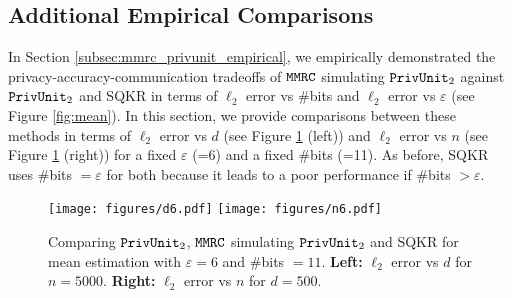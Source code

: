 \subsection{Additional Empirical Comparisons}\label{appendix:mmrc_pu_emp}
In Section \ref{subsec:mmrc_privunit_empirical}, we empirically demonstrated the privacy-accuracy-communication tradeoffs of $\texttt{MMRC}$ simulating $\texttt{PrivUnit}_2$ against $\texttt{PrivUnit}_2$ and SQKR in terms of $\ell_2$ error vs $\#$bits and $\ell_2$ error vs $\varepsilon$ (see Figure \ref{fig:mean}). In this section, we provide comparisons between these methods in terms of $\ell_2$ error vs $d$ (see Figure \ref{fig:mean_app} (left)) and $\ell_2$ error vs $n$ (see Figure \ref{fig:mean_app} (right)) for a fixed $\varepsilon$ (=6) and a fixed $\#$bits (=11). As before, SQKR uses $\#$bits $= \varepsilon$ for both because it leads to a poor performance if $\#$bits $ > \varepsilon$.
\begin{figure}[h]
\centering
\texttt{[image: figures/d6.pdf]} \qquad \texttt{[image: figures/n6.pdf]}%
\caption{Comparing $\texttt{PrivUnit}_2$, $\texttt{MMRC}$ simulating $\texttt{PrivUnit}_2$ and SQKR for mean estimation with $\varepsilon=6$ and $\#$bits $=11$. \textbf{Left:} $\ell_2$ error vs $d$ for $n = 5000$. \textbf{Right:} $\ell_2$ error vs $n$ for $d = 500$.}
\label{fig:mean_app}
\end{figure}